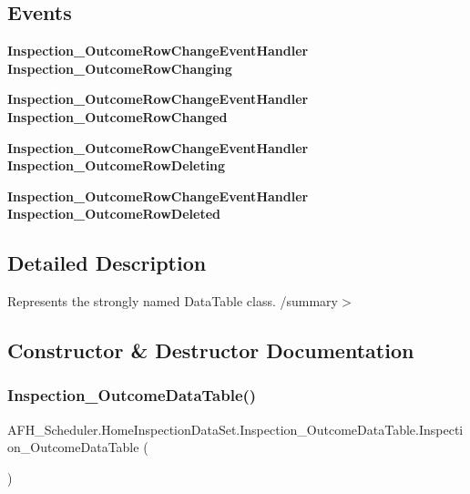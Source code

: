 \subsection*{Events}
\begin{DoxyCompactItemize}
\item 
\textbf{ Inspection\+\_\+\+Outcome\+Row\+Change\+Event\+Handler} \textbf{ Inspection\+\_\+\+Outcome\+Row\+Changing}
\item 
\textbf{ Inspection\+\_\+\+Outcome\+Row\+Change\+Event\+Handler} \textbf{ Inspection\+\_\+\+Outcome\+Row\+Changed}
\item 
\textbf{ Inspection\+\_\+\+Outcome\+Row\+Change\+Event\+Handler} \textbf{ Inspection\+\_\+\+Outcome\+Row\+Deleting}
\item 
\textbf{ Inspection\+\_\+\+Outcome\+Row\+Change\+Event\+Handler} \textbf{ Inspection\+\_\+\+Outcome\+Row\+Deleted}
\end{DoxyCompactItemize}


\subsection{Detailed Description}
Represents the strongly named Data\+Table class. /summary$>$ 

\subsection{Constructor \& Destructor Documentation}
\mbox{\label{class_a_f_h___scheduler_1_1_home_inspection_data_set_1_1_inspection___outcome_data_table_a67cf5fb356a999416cf3328067f5ddaf}} 
\subsubsection{Inspection\_OutcomeDataTable()\hspace{0.1cm}{\footnotesize\ttfamily [1/2]}}
{\footnotesize\ttfamily A\+F\+H\+\_\+\+Scheduler.\+Home\+Inspection\+Data\+Set.\+Inspection\+\_\+\+Outcome\+Data\+Table.\+Inspection\+\_\+\+Outcome\+Data\+Table (\begin{DoxyParamCaption}{ }\end{DoxyParamCaption})}

